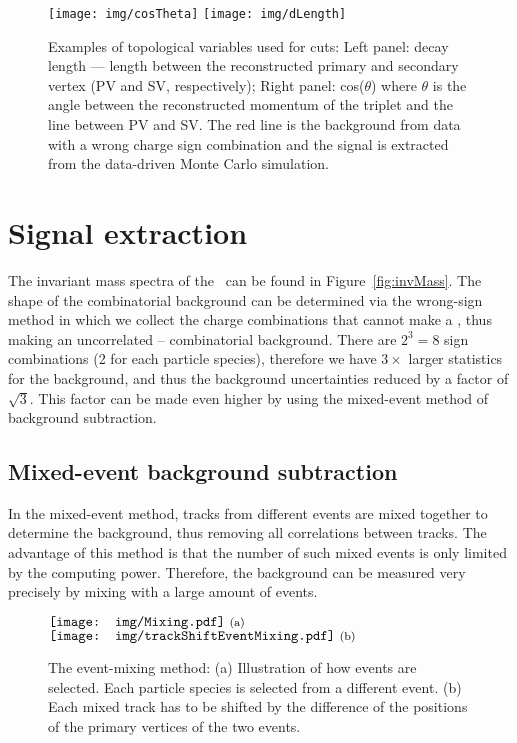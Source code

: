 \begin{figure}[htb]
\centering
\texttt{[image: img/cosTheta]}
\texttt{[image: img/dLength]}
\caption{Examples of topological variables used for cuts: Left panel: decay length --- length between the reconstructed primary and secondary vertex (PV and SV, respectively); Right panel: cos($\theta$) where $\theta$ is the angle between the reconstructed momentum of the triplet and the line between PV and SV\@. The red line is the background from data with a wrong charge sign combination and the signal is extracted from the data-driven Monte Carlo simulation.}
\label{fig:optimization}
\end{figure}



\section{Signal extraction}

The invariant mass spectra of the \Lambdac\ can be found in Figure~\ref{fig:invMass}. The shape of the combinatorial background can be determined via the wrong-sign method in which we collect the charge combinations that cannot make a \Lambdac, thus making an uncorrelated -- combinatorial background. There are $2^3 = 8$ sign combinations (2 for each particle species), therefore we have $3\times$ larger statistics for the background, and thus the background uncertainties reduced by a factor of $\sqrt{3}$. This factor can be made even higher by using the mixed-event method of background subtraction.

\subsection{Mixed-event background subtraction}
In the mixed-event method, tracks from different events are mixed together to determine the background, thus removing all correlations between tracks. The advantage of this method is that the number of such mixed events is only limited by the computing power. Therefore, the background can be measured very precisely by mixing with a large amount of events. 

\begin{figure}[htb]
\centering
$
\vcenter{\hbox{\texttt{[image: img/Mixing.pdf]}
\footnotesize{(a)}
}}
$
\hspace*{0.\textwidth}
$
\vcenter{\hbox{\texttt{[image: img/trackShiftEventMixing.pdf]}
\footnotesize{(b)}
}}
$
\caption{The event-mixing method: (a) Illustration of how events are selected. Each particle species is selected from a different event. (b) Each mixed track has to be shifted by the difference of the positions of the primary vertices of the two events.}
\label{fig:mixedIllustrations}
\end{figure}

